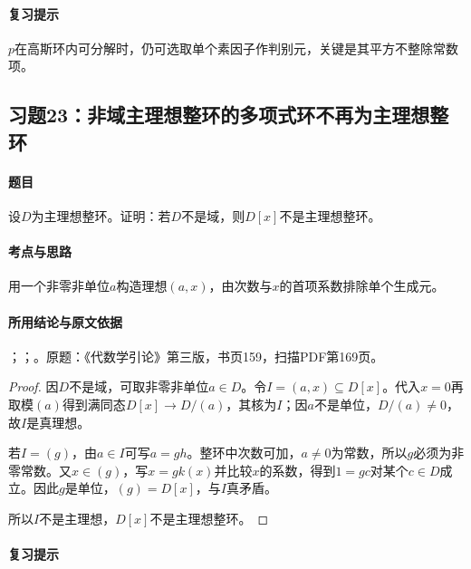 \paragraph{复习提示}

$p$在高斯环内可分解时，仍可选取单个素因子作判别元，关键是其平方不整除常数项。

\subsection{习题23：非域主理想整环的多项式环不再为主理想整环}

\label{ex:4:23}

\paragraph{题目}

设$D$为主理想整环。证明：若$D$不是域，则$D[x]$不是主理想整环。

\paragraph{考点与思路}

用一个非零非单位$a$构造理想$(a,x)$，由次数与$x$的首项系数排除单个生成元。

\paragraph{所用结论与原文依据}

；；。原题：《代数学引论》第三版，书页159，扫描PDF第169页。


\begin{proof}

因$D$不是域，可取非零非单位$a\in D$。令$I=(a,x)\subseteq D[x]$。代入$x=0$再取模$(a)$得到满同态$D[x]\to D/(a)$，其核为$I$；因$a$不是单位，$D/(a)\ne0$，故$I$是真理想。

若$I=(g)$，由$a\in I$可写$a=gh$。整环中次数可加，$a\ne0$为常数，所以$g$必须为非零常数。又$x\in(g)$，写$x=gk(x)$并比较$x$的系数，得到$1=gc$对某个$c\in D$成立。因此$g$是单位，$(g)=D[x]$，与$I$真矛盾。

所以$I$不是主理想，$D[x]$不是主理想整环。

\end{proof}

\paragraph{复习提示}

